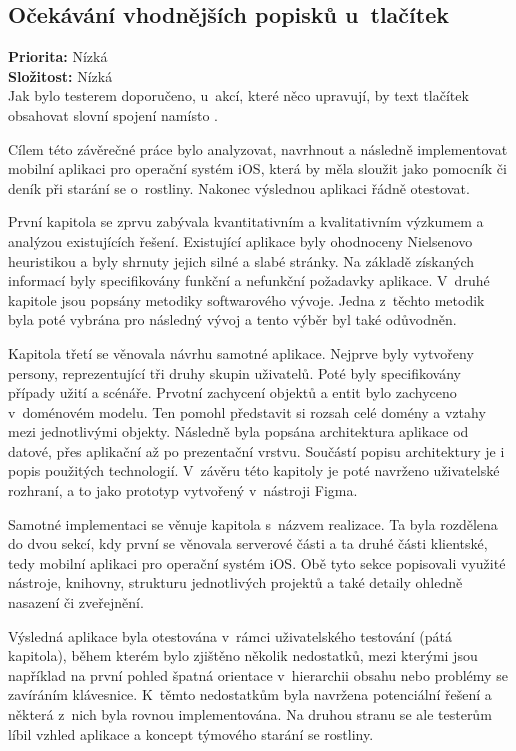 \documentclass[thesis=M,czech]{FITthesis}[2019/12/23]
\begin{document}
\subsection*{Očekávání vhodnějších popisků u~tlačítek}
\textbf{Priorita:} Nízká \\
\textbf{Složitost:} Nízká \\

Jak bylo testerem doporučeno, u~akcí, které něco upravují, by text tlačítek obsahovat slovní spojení  namísto .


\begin{conclusion}
Cílem této závěrečné práce bylo analyzovat, navrhnout a následně implementovat mobilní aplikaci pro operační systém iOS, která by měla sloužit jako pomocník či deník při starání se o~rostliny. Nakonec výslednou aplikaci řádně otestovat.

První kapitola se zprvu zabývala kvantitativním a kvalitativním výzkumem a analýzou existujících řešení. Existující aplikace byly ohodnoceny Nielsenovo heuristikou a byly shrnuty jejich silné a slabé stránky. Na základě získaných informací byly specifikovány funkční a nefunkční požadavky aplikace. V~druhé kapitole jsou popsány metodiky softwarového vývoje. Jedna z~těchto metodik byla poté vybrána pro následný vývoj a tento výběr byl také odůvodněn.

Kapitola třetí se věnovala návrhu samotné aplikace. Nejprve byly vytvořeny persony, reprezentující tři druhy skupin uživatelů. Poté byly specifikovány případy užití a scénáře. Prvotní zachycení objektů a entit bylo zachyceno v~doménovém modelu. Ten pomohl představit si rozsah celé domény a vztahy mezi jednotlivými objekty. Následně byla popsána architektura aplikace od datové, přes aplikační až po prezentační vrstvu. Součástí popisu architektury je i popis použitých technologií. V~závěru této kapitoly je poté navrženo uživatelské rozhraní, a to jako prototyp vytvořený v~nástroji Figma.

Samotné implementaci se věnuje kapitola s~názvem realizace. Ta byla rozdělena do dvou sekcí, kdy první se věnovala serverové části a ta druhé části klientské, tedy mobilní aplikaci pro operační systém iOS. Obě tyto sekce popisovali využité nástroje, knihovny, strukturu jednotlivých projektů a také detaily ohledně nasazení či zveřejnění.

Výsledná aplikace byla otestována v~rámci uživatelského testování (pátá kapitola), během kterém bylo zjištěno několik nedostatků, mezi kterými jsou například na první pohled špatná orientace v~hierarchii obsahu nebo problémy se zavíráním klávesnice. K~těmto nedostatkům byla navržena potenciální řešení a některá z~nich byla rovnou implementována. Na druhou stranu se ale testerům líbil vzhled aplikace a koncept týmového starání se rostliny.


\end{conclusion}
\end{document}
